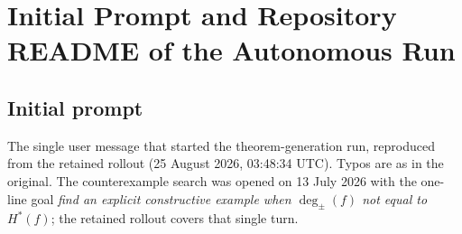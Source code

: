 \documentclass{article}
\theoremstyle{definition}
\theoremstyle{plain}
\newcommand{\hstar}{H^{\ast}}
\newcommand{\tdeg}{\deg_{\pm}}
\begin{document}
\section{Initial Prompt and Repository README of the Autonomous Run}
\label{app:prompt}

\subsection{Initial prompt}

The single user message that started the theorem-generation run, reproduced from the retained rollout (25 August 2026, 03:48:34 UTC). Typos are as in the original. The counterexample search was opened on 13 July 2026 with the one-line goal \emph{find an explicit constructive example when $\tdeg(f)$ not equal to $\hstar(f)$}; the retained rollout covers that single turn.
\end{document}
